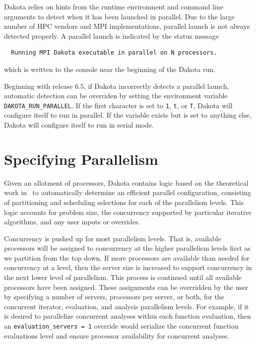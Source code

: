 Dakota relies on hints from the runtime environment and command
line arguments to detect when it has been launched in parallel. Due to 
the large number of HPC vendors and MPI implementations, parallel launch
is not always detected properly. A parallel launch is indicated
by the status message 
\begin{small}
\begin{verbatim}
  Running MPI Dakota executable in parallel on N processors. 
\end{verbatim}
\end{small}

which is written to the console near the beginning of the Dakota run.

Beginning with release 6.5, if Dakota incorrectly detects a parallel launch, 
automatic detection can be overriden by setting the environment variable 
\texttt{DAKOTA\_RUN\_PARALLEL}. If the first character is set to \texttt{1}, 
\texttt{t}, or \texttt{T}, Dakota will configure itself to run in parallel.
If the variable exists but is set to anything else, Dakota will configure 
itself to run in serial mode.

\section{Specifying Parallelism}\label{parallel:spec}

Given an allotment of processors, Dakota contains logic based on the
theoretical work in~\cite{Eld00} to automatically determine an efficient
parallel configuration, consisting of partitioning and scheduling
selections for each of the parallelism levels. This logic accounts for
problem size, the concurrency supported by particular iterative
algorithms, and any user inputs or overrides. 

Concurrency is pushed up for most parallelism levels. That is,
available processors will be assigned to concurrency at the higher
parallelism levels first as we partition from the top down.  If more
processors are available than needed for concurrency at a level, then
the server size is increased to support concurrency in the next lower
level of parallelism.  This process is continued until all available
processors have been assigned. These assignments can be overridden by
the user by specifying a number of servers, processors per server, or
both, for the concurrent iterator, evaluation, and analysis
parallelism levels. For example, if it is desired to parallelize
concurrent analyses within each function evaluation, then an
\texttt{evaluation\_servers = 1} override would serialize the
concurrent function evaluations level and ensure processor
availability for concurrent analyses.

